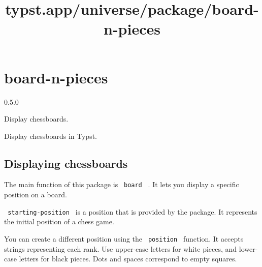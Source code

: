 \title{typst.app/universe/package/board-n-pieces}

\label{banner}
\section{board-n-pieces}\label{board-n-pieces}

{ 0.5.0 }

Display chessboards.

\label{readme}
Display chessboards in Typst.

\subsection{Displaying chessboards}\label{displaying-chessboards}

The main function of this package is \texttt{\ board\ } . It lets you
display a specific position on a board.

\begin{Shaded}
\begin{Highlighting}[]
\end{Highlighting}
\end{Shaded}

\pandocbounded{}

\texttt{\ starting-position\ } is a position that is provided by the
package. It represents the initial position of a chess game.

You can create a different position using the \texttt{\ position\ }
function. It accepts strings representing each rank. Use upper-case
letters for white pieces, and lower-case letters for black pieces. Dots
and spaces correspond to empty squares.

\begin{Shaded}
\begin{Highlighting}[]
\NormalTok{))}
\end{Highlighting}
\end{Shaded}

\pandocbounded{}

